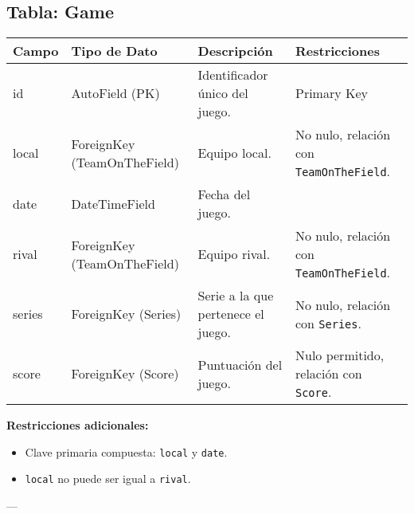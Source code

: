 \documentclass{report}
\begin{document}
    \subsection*{Tabla: Game}
    \begin{tabular}{|>{\raggedright\arraybackslash}p{3cm}|>{\raggedright\arraybackslash}p{3cm}|>{\raggedright\arraybackslash}p{6cm}|>{\raggedright\arraybackslash}p{4cm}|}
        \hline
        \textbf{Campo} & \textbf{Tipo de Dato} & \textbf{Descripción} & \textbf{Restricciones} \\
        \hline
        id & AutoField (PK) & Identificador único del juego. & Primary Key \\
        \hline
        local & ForeignKey (TeamOnTheField) & Equipo local. & No nulo, relación con \texttt{TeamOnTheField}. \\
        \hline
        date & DateTimeField & Fecha del juego. &  \\
        \hline
        rival & ForeignKey (TeamOnTheField) & Equipo rival. & No nulo, relación con \texttt{TeamOnTheField}. \\
        \hline
        series & ForeignKey (Series) & Serie a la que pertenece el juego. & No nulo, relación con \texttt{Series}. \\
        \hline
        score & ForeignKey (Score) & Puntuación del juego. & Nulo permitido, relación con \texttt{Score}. \\
        \hline
    \end{tabular}
    
    \textbf{Restricciones adicionales:}
    \begin{itemize}
        \item Clave primaria compuesta: \texttt{local} y \texttt{date}.
        \item \texttt{local} no puede ser igual a \texttt{rival}.
    \end{itemize}
    
    ---
    
\end{document}
